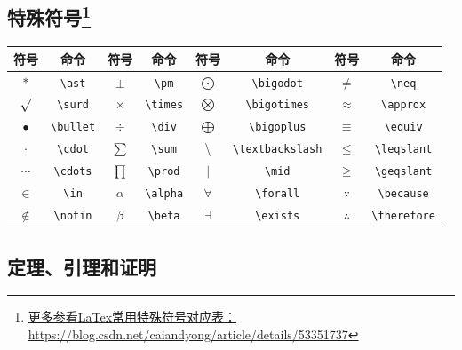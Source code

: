 \subsection{特殊符号\footnote{\href{https://blog.csdn.net/caiandyong/article/details/53351737}{更多参看LaTex常用特殊符号对应表：https://blog.csdn.net/caiandyong/article/details/53351737}}}\label{subsec:sysmbol}

\begin{center}
	\begin{tabular}{cc|cc|cc|cc}
		\toprule
		符号  & 命令 &符号 & 命令 &符号 & 命令 &符号 & 命令  \\
		\midrule
		$\ast$ & \verb|\ast| & $\pm$ & \verb|\pm|  & $\bigodot$ & \verb|\bigodot|  & $\neq$ & \verb|\neq| \\
		$\surd$  & \verb|\surd|  & $\times$ & \verb|\times|  & $\bigotimes$ & \verb|\bigotimes| & $\approx$ & \verb|\approx|\\
 		$\bullet$  & \verb|\bullet| & $\div$ & \verb|\div|  & $\bigoplus$ & \verb|\bigoplus| & $\equiv$ & \verb|\equiv|\\
		$\cdot$  & \verb|\cdot|    & $\sum$ & \verb|\sum| & \textbackslash & \verb|\textbackslash|  & $\leqslant$ & \verb|\leqslant|\\
		$\cdots$  & \verb|\cdots|  & $\prod$ & \verb|\prod| & $\mid$ & \verb|\mid| & $\geqslant$ & \verb|\geqslant|\\
		 $\in$ & \verb|\in|    & $\alpha$ & \verb|\alpha| & $\forall$ & \verb|\forall|  & $\because$ & \verb|\because|\\
		$\notin$ & \verb|\notin| & $\beta$ & \verb|\beta| & $\exists$ & \verb|\exists|  & $\therefore$ & \verb|\therefore|\\
		\bottomrule
	\end{tabular}
\end{center}

\subsection{定理、引理和证明}

